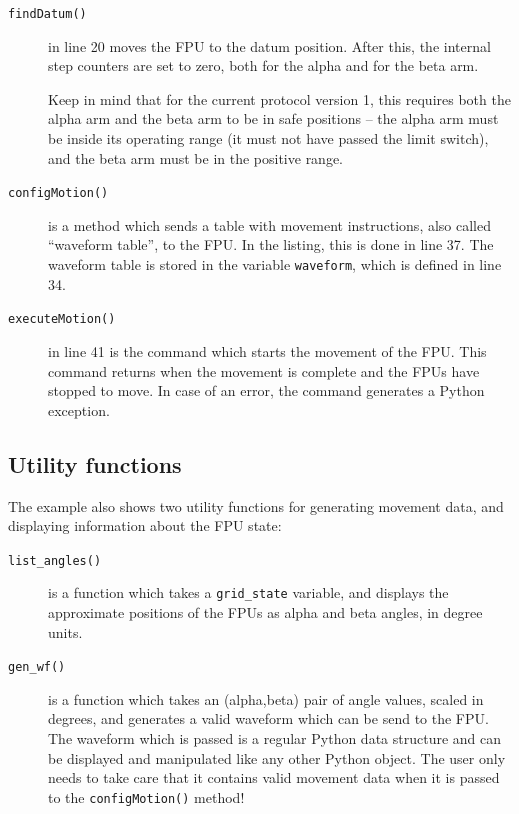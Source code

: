 \documentclass[11pt,a4paper]{report}
\begin{document}
\begin{description}
\item[\texttt{findDatum()}] in line 20 moves the FPU to the datum
  position. After this, the internal step counters are set to zero,
  both for the alpha and for the beta arm.

  Keep in mind that for the current protocol version 1, this requires
  both the alpha arm and the beta arm to be in safe positions -- the
  alpha arm must be inside its operating range (it must not have
  passed the limit switch), and the beta arm must be in the positive
  range.

\item[\texttt{configMotion()}] is a method which sends a table with
  movement instructions, also called ``waveform table'', to the
  FPU. In the listing, this is done in line 37. The waveform table is
  stored in the variable \texttt{waveform}, which is defined in line
  34.

\item[\texttt{executeMotion()}] in line 41 is the command which starts
  the movement of the FPU. This command returns when the movement is
  complete and the FPUs have stopped to move. In case of an error, the
  command generates a Python exception.

\end{description}

\subsection{Utility functions}
The example also shows two utility functions for generating movement
data, and displaying information about the FPU state:

\begin{description}
\item[\texttt{list\_angles()}] is a function which takes a \texttt{grid\_state}
  variable, and displays the approximate positions of the FPUs as
  alpha and beta angles, in degree units.

\item[\texttt{gen\_wf()}] is a function which takes an (alpha,beta)
  pair of angle values, scaled in degrees, and generates a valid
  waveform which can be send to the FPU.  The waveform which is passed
  is a regular Python data structure and can be displayed and
  manipulated like any other Python object.  The user only needs to
  take care that it contains valid movement data when it is passed to
  the \texttt{configMotion()} method!


\end{description}
\end{document}
